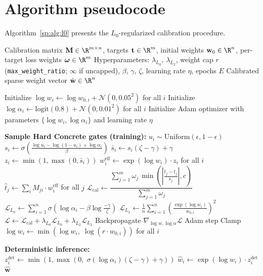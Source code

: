 \section{Algorithm pseudocode}
\label{sp:app:algorithm}

Algorithm~\ref{sp:alg:l0} presents the $L_0$-regularized calibration procedure.

\begin{algorithm}[H]
\caption{$L_0$-regularized calibration with Hard Concrete gates}
\label{sp:alg:l0}
\begin{algorithmic}[1]
\Require Calibration matrix $\mathbf{M} \in \R^{m \times n}$, targets $\mathbf{t} \in \R^m$, initial weights $\mathbf{w}_0 \in \R^n$, per-target loss weights $\boldsymbol{\omega} \in \R^m$
\Require Hyperparameters: $\lambda_{L_0}$, $\lambda_{L_2}$, weight cap $r$ (\texttt{max\_weight\_ratio}; $\infty$ if uncapped), $\beta$, $\gamma$, $\zeta$, learning rate $\eta$, epochs $E$
\Ensure Calibrated sparse weight vector $\hat{\mathbf{w}} \in \R^n$

\State Initialize $\log w_i \gets \log w_{0,i} + \mathcal{N}(0, 0.05^2)$ for all $i$
\State Initialize $\log \alpha_i \gets \text{logit}(0.8) + \mathcal{N}(0, 0.01^2)$ for all $i$
\State Initialize Adam optimizer with parameters $\{\log w_i, \log \alpha_i\}$ and learning rate $\eta$

    \State \textbf{Sample Hard Concrete gates (training):}
        \State $u_i \sim \text{Uniform}(\epsilon, 1-\epsilon)$
        \State $s_i \gets \sigma\!\left(\frac{\log u_i - \log(1-u_i) + \log \alpha_i}{\beta}\right)$
        \State $\bar{s}_i \gets s_i(\zeta - \gamma) + \gamma$
        \State $z_i \gets \min(1, \max(0, \bar{s}_i))$
    \EndFor
    \State $w_i^{\text{eff}} \gets \exp(\log w_i) \cdot z_i$ for all $i$
    \State $\hat{t}_j \gets \sum_i M_{ji} \cdot w_i^{\text{eff}}$ for all $j$
    \State $\mathcal{L}_{\text{cal}} \gets \dfrac{\sum_{j=1}^{m}\omega_j\,\min\!\left(\left|\frac{\hat{t}_j - t_j}{s_j}\right|, c\right)}{\sum_{j=1}^{m}\omega_j}$
    \State $\mathcal{L}_{L_0} \gets \sum_{i=1}^{n} \sigma\!\left(\log \alpha_i - \beta \log \frac{-\gamma}{\zeta}\right)$
    \State $\mathcal{L}_{L_2} \gets \frac{1}{n}\sum_{i=1}^{n}\left(\frac{\exp(\log w_i)}{w_{0,i}}\right)^2$ 
    \State $\mathcal{L} \gets \mathcal{L}_{\text{cal}} + \lambda_{L_0} \mathcal{L}_{L_0} + \lambda_{L_2} \mathcal{L}_{L_2}$
    \State Backpropagate $\nabla_{\log w, \log \alpha} \mathcal{L}$
    \State Adam step
    \State Clamp $\log w_i \gets \min\!\left(\log w_i,\; \log(r \cdot w_{0,i})\right)$ for all $i$ 
\EndFor

\State \textbf{Deterministic inference:}
    \State $z_i^{\text{det}} \gets \min\!\left(1, \max\!\left(0,\; \sigma(\log \alpha_i)(\zeta - \gamma) + \gamma\right)\right)$
    \State $\hat{w}_i \gets \exp(\log w_i) \cdot z_i^{\text{det}}$
\EndFor
\State \Return $\hat{\mathbf{w}}$
\end{algorithmic}
\end{algorithm}

